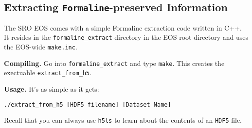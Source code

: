 \documentclass[letterpaper,11pt]{refart}
\begin{document}
\subsection{Extracting \texttt{Formaline}-preserved Information}

The SRO EOS comes with a simple Formaline extraction code written in
C++. It resides in the \texttt{\color{red}formaline\_extract} directory
in the EOS root directory and uses the EOS-wide \texttt{make.inc}.

\textbf{Compiling.}\hspace*{1em} Go into
\texttt{\color{red}formaline\_extract} and type \texttt{make}. This
creates the exectuable \texttt{\color{magenta}extract\_from\_h5}.


\textbf{Usage.}\hspace*{1em} It's as simple as it gets:

\texttt{./extract\_from\_h5 [HDF5 filename] [Dataset Name]}

Recall that you can always use \texttt{h5ls} to learn about the
contents of an \texttt{HDF5} file.



\newpage


\end{document}
